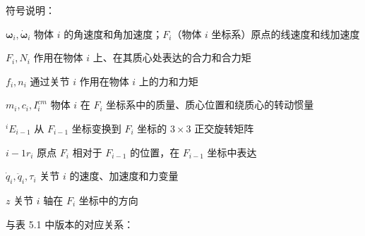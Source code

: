 \documentclass[10pt,a4paper]{book}
\theoremstyle{thmstyle} %
\theoremstyle{defstyle} %
\theoremstyle{prostyle} %
\begin{document}
符号说明：



$\boldsymbol{\omega}_{i}, \dot{\boldsymbol{\omega}}_{i}$ 物体 $i$ 的角速度和角加速度；$F_{i}$（物体 $i$ 坐标系）原点的线速度和线加速度



$F_{i}, N_{i}$ 作用在物体 $i$ 上、在其质心处表达的合力和合力矩



$f_{i}, n_{i}$ 通过关节 $i$ 作用在物体 $i$ 上的力和力矩



$m_{i}, c_{i}, I_{i}^{cm}$ 物体 $i$ 在 $F_{i}$ 坐标系中的质量、质心位置和绕质心的转动惯量



$^{i}E_{i-1}$ 从 $F_{i-1}$ 坐标变换到 $F_{i}$ 坐标的 $3 \times 3$ 正交旋转矩阵



$i-1r_{i}$ 原点 $F_{i}$ 相对于 $F_{i-1}$ 的位置，在 $F_{i-1}$ 坐标中表达



$\dot{q}_{i}, \ddot{q}_{i}, \tau_{i}$ 关节 $i$ 的速度、加速度和力变量



$z$ 关节 $i$ 轴在 $F_{i}$ 坐标中的方向



与表 5.1 中版本的对应关系：
\end{document}
